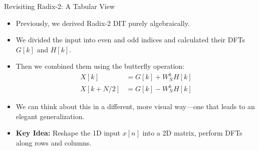\begin{frame}{Revisiting Radix-2: A Tabular View}
    \begin{itemize}
        \item Previously, we derived Radix-2 DIT purely algebraically.
        \item We divided the input into even and odd indices and calculated their DFTs $G[k]$ and $H[k]$.
        \item Then we combined them using the butterfly operation:
              \begin{align*}
                  X[k]     & = G[k] + W_N^k H[k] \\
                  X[k+N/2] & = G[k] - W_N^k H[k]
              \end{align*}
        \item We can think about this in a different, more visual way—one that leads to an elegant generalization.
        \item \textbf{Key Idea:} Reshape the 1D input $x[n]$ into a 2D matrix, perform DFTs along rows and columns.
    \end{itemize}
\end{frame}

